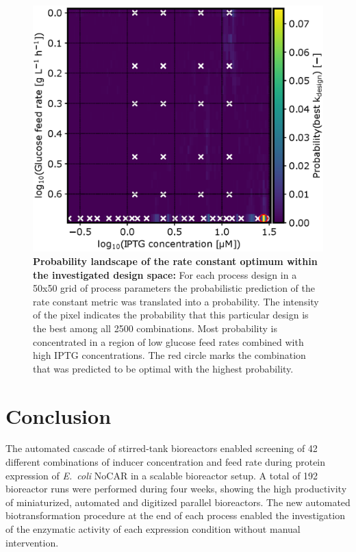\documentclass[sn-standardnature]{sn-jnl}%
\theoremstyle{thmstyleone}%
\theoremstyle{thmstyletwo}%
\theoremstyle{thmstylethree}%
\begin{document}
\begin{figure}[H]
    \centering
    \includegraphics[width=1.0\textwidth]{figures/Fig14.eps}
    \caption{
        \textbf{Probability landscape of the rate constant optimum within the investigated design space:}
        For each process design in a 50x50 grid of process parameters the probabilistic prediction of the rate constant metric was translated into a probability.
        The intensity of the pixel indicates the probability that this particular design is the best among all 2500 combinations.
        Most probability is concentrated in a region of low glucose feed rates combined with high IPTG concentrations.
        The red circle marks the combination that was predicted to be optimal with the highest probability.
    }
    \label{fig_kdesign_probs}
\end{figure}


\section{Conclusion}

The automated cascade of stirred-tank bioreactors enabled screening of 42 different combinations of inducer concentration and feed rate during protein expression of \textit{E.~coli} NoCAR in a scalable bioreactor setup.
A total of 192 bioreactor runs were performed during four weeks, showing the high productivity of miniaturized, automated and digitized parallel bioreactors.
The new automated biotransformation procedure at the end of each process enabled the investigation of the enzymatic activity of each expression condition without manual intervention.
\end{document}

